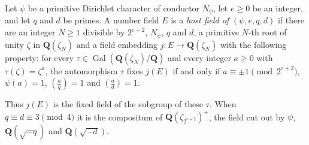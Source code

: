 \begin{definition}\label{hf-host-field-of-character}
Let $\psi$ be a primitive Dirichlet character of conductor $N_\psi$, let $e\geq0$ be an integer, and
let $q$ and $d$ be primes. A number field $E$ is a \emph{host field of} $(\psi,e,q,d)$ if there are
an integer $N\geq1$ divisible by $2^{e+2}$, $N_\psi$, $q$ and $d$, a primitive $N$-th root of unity
$\zeta$ in $\mathbf Q(\zeta_N)$ and a field embedding $j\colon E\to\mathbf Q(\zeta_N)$ with the
following property: for every $\tau\in\operatorname{Gal}(\mathbf Q(\zeta_N)/\mathbf Q)$ and every
integer $a\geq0$ with $\tau(\zeta)=\zeta^a$, the automorphism $\tau$ fixes $j(E)$ if and only if
$a\equiv\pm1\pmod{2^{e+2}}$, $\psi(a)=1$, $\left(\frac aq\right)=1$ and
$\left(\frac ad\right)=1$.

Thus $j(E)$ is the fixed field of the subgroup of these $\tau$. When $q\equiv d\equiv3\pmod4$ it is
the compositum of $\mathbf Q(\zeta_{2^{e+2}})^+$, the field cut out by $\psi$, $\mathbf Q(\sqrt{-q})$
and $\mathbf Q(\sqrt{-d})$.
\end{definition}

